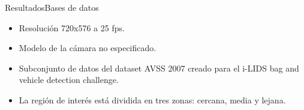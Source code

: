 
\begin{frame}{Resultados}{Bases de datos}

\begin{itemize}
    \justifying
    \item Resolución 720x576 a 25 fps.
    \item Modelo de la cámara no especificado.
    \item Subconjunto de datos del dataset AVSS 2007 creado para el i-LIDS bag and vehicle detection challenge.
    \item La región de interés está dividida en tres zonas: cercana, media y lejana.
\end{itemize}

\vspace{0.1cm}


\end{frame}
